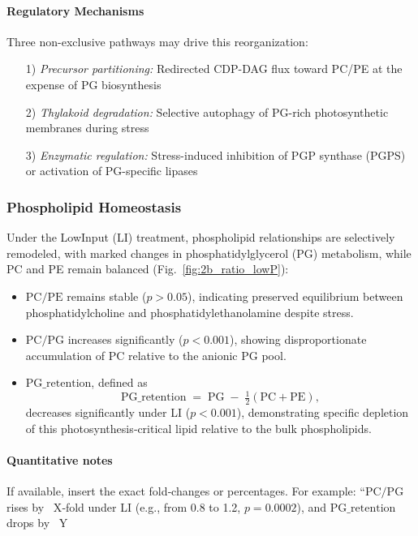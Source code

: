 \documentclass[10pt,letterpaper]{article}
\begin{document}
\paragraph{Regulatory Mechanisms}
Three non-exclusive pathways may drive this reorganization:
\begin{itemize}
\item[1)] \textit{Precursor partitioning:} Redirected CDP-DAG flux toward PC/PE at the expense of PG biosynthesis

\item[2)] \textit{Thylakoid degradation:} Selective autophagy of PG-rich photosynthetic membranes during stress

\item[3)] \textit{Enzymatic regulation:} Stress-induced inhibition of PGP synthase (PGPS) or activation of PG-specific lipases
\end{itemize}


\subsubsection*{Phospholipid Homeostasis}

Under the LowInput (LI) treatment, phospholipid relationships are selectively remodeled, with marked changes in phosphatidylglycerol (PG) metabolism, while PC and PE remain balanced (Fig.~\ref{fig:2b_ratio_lowP}):

\begin{itemize}
  \item \textbf{\(\mathrm{PC/PE}\)} remains stable (\(p>0.05\)), indicating preserved equilibrium between phosphatidylcholine and phosphatidylethanolamine despite stress.
  \item \textbf{\(\mathrm{PC/PG}\)} increases significantly (\(p<0.001\)), showing disproportionate accumulation of PC relative to the anionic PG pool.
  \item \textbf{\(\mathrm{PG\_retention}\)}, defined as
    \[
      \mathrm{PG\_retention} \;=\; \mathrm{PG} \;-\; \tfrac{1}{2}(\mathrm{PC} + \mathrm{PE}),
    \]
    decreases significantly under LI (\(p<0.001\)), demonstrating specific depletion of this photosynthesis‑critical lipid relative to the bulk phospholipids.
\end{itemize}

\paragraph{Quantitative notes}  
If available, insert the exact fold‑changes or percentages. For example:  
“\(\mathrm{PC/PG}\) rises by ~X‑fold under LI (e.g., from 0.8 to 1.2, \(p=0.0002\)), and \(\mathrm{PG\_retention}\) drops by ~Y%
\end{document}
